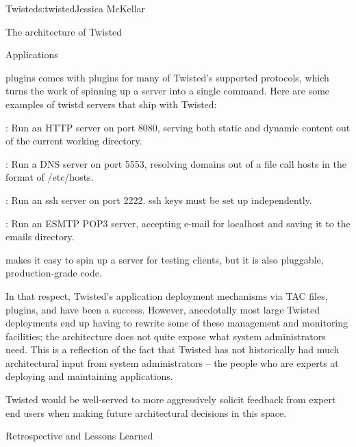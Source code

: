 \begin{aosachapter}{Twisted}{s:twisted}{Jessica McKellar}
\begin{aosasect1}{The architecture of Twisted}
\begin{aosasect2}{Applications}
\begin{aosasect3}{plugins}
 comes with plugins for many of Twisted's supported
protocols, which turns the work of spinning up a server into a single
command. Here are some examples of twistd servers that ship with Twisted:

\begin{aosaitemize}

\item {}:  Run an HTTP server on
  port 8080, serving both static and dynamic content out of the
  current working directory.

\item {}: Run a DNS server
  on port 5553, resolving domains out of a file call hosts in the
  format of /etc/hosts.

\item {}: Run an ssh server on port
  2222. ssh keys must be set up independently.

\item {}: Run an
  ESMTP POP3 server, accepting e-mail for localhost and saving it to
  the emails directory.

\end{aosaitemize}

 makes it easy to spin up a server for testing clients,
but it is also pluggable, production-grade code.

In that respect, Twisted's application deployment mechanisms via TAC files,
plugins, and  have been a success. However, anecdotally most
large Twisted deployments end up having to rewrite some of these management and
monitoring facilities; the architecture does not quite expose what system
administrators need. This is a reflection of the fact that Twisted has not
historically had much architectural input from system administrators -- the
people who are experts at deploying and maintaining applications.

Twisted would be well-served to more aggressively solicit feedback from
expert end users when making future architectural decisions in this space.

\end{aosasect3}

\end{aosasect2}

\end{aosasect1}

\begin{aosasect1}{Retrospective and Lessons Learned}


\end{aosasect1}
\end{aosachapter}
